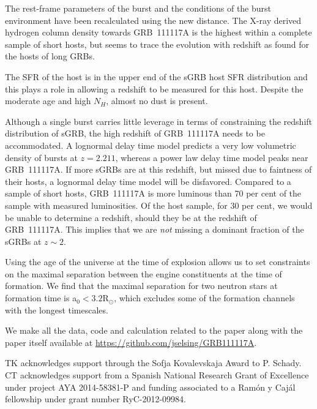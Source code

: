\documentclass{aa}    %
\begin{document}
The rest-frame parameters of the burst and the conditions of the burst environment have been recalculated using the new distance. The X-ray derived hydrogen column density towards GRB~111117A is the highest within a complete sample of short hosts, but seems to trace the evolution with redshift as found for the hosts of long GRBs. 

The SFR of the host is in the upper end of the sGRB host SFR distribution and this plays a role in allowing a redshift to be measured for this host. Despite the moderate age and high $N_H$, almost no dust is present.

Although a single burst carries little leverage in terms of constraining the redshift distribution of sGRB, the high redshift of GRB~111117A needs to be accommodated. A lognormal delay time model predicts a very low volumetric density of bursts at $z = 2.211$, whereas a power law delay time model peaks near GRB~111117A. If more sGRBs are at this redshift, but missed due to faintness of their hosts, a lognormal delay time model will be disfavored. Compared to a sample of short hosts, GRB~111117A is more luminous than 70 per cent of the sample with measured luminosities. Of the host sample, for 30 per cent, we would be unable to determine a redshift, should they be at the redshift of GRB~111117A. This implies that we are \textit{not} missing a dominant fraction of the sGRBs at $z \sim 2$.

Using the age of the universe at the time of explosion allows us to set constraints on the maximal separation between the engine constituents at the time of formation. We find that the maximal separation for two neutron stars at formation time is a$_0 < 3.2 $R$_\odot$, which excludes some of the formation channels with the longest timescales. 

We make all the data, code and calculation related to the paper along with the paper itself available at \url{https://github.com/jselsing/GRB111117A}.

\begin{acknowledgements}
TK acknowledges support through the Sofja Kovalevskaja Award to P. Schady. CT acknowledges support from a Spanish National Research Grant of Excellence under project AYA 2014-58381-P and funding associated to a Ramón y Cajál fellowship under grant number RyC-2012-09984.
\end{acknowledgements}




\newpage




\end{document}
